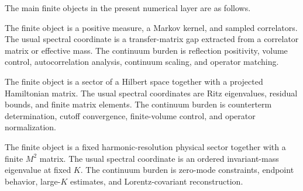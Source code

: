 The main finite objects in the present numerical layer are as follows.
\begin{description}[leftmargin=0.24\textwidth,style=nextline]
  \item[Euclidean lattice Monte Carlo.]
  The finite object is a positive measure, a Markov kernel, and sampled
  correlators.  The usual spectral coordinate is a transfer-matrix gap
  extracted from a correlator matrix or effective mass.  The continuum burden
  is reflection positivity, volume control, autocorrelation analysis,
  continuum scaling, and operator matching.
  \item[Hamiltonian truncation/TCSA/TFFSA.]
  The finite object is a sector of a Hilbert space together with a projected
  Hamiltonian matrix.  The usual spectral coordinates are Ritz eigenvalues,
  residual bounds, and finite matrix elements.  The continuum burden is
  counterterm determination, cutoff convergence, finite-volume control, and
  operator normalization.
  \item[DLCQ/light-front truncation.]
  The finite object is a fixed harmonic-resolution physical sector together
  with a finite \(M^2\) matrix.  The usual spectral coordinate is an ordered
  invariant-mass eigenvalue at fixed \(K\).  The continuum burden is
  zero-mode constraints, endpoint behavior, large-\(K\) estimates, and
  Lorentz-covariant reconstruction.
\end{description}

